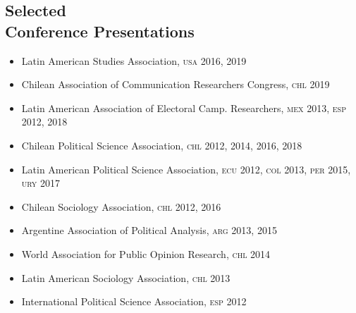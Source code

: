 \documentclass[letterpaper,margin]{res}
\begin{document}
\begin{resume}




\section{\footnotesize Selected \\ Conference Presentations}

\begin{itemize}
\item{\small Latin American Studies Association, {\scshape usa} 2016, 2019}
\item{\small Chilean Association of Communication Researchers Congress, {\scshape chl} 2019}
\item{\small Latin American Association of Electoral Camp. Researchers, {\scshape mex} 2013, {\scshape esp} 2012, 2018}
\item{\small Chilean Political Science Association, {\scshape chl} 2012, 2014, 2016, 2018}
\item{\small Latin American Political Science Association, {\scshape ecu} 2012, {\scshape col} 2013, {\scshape per} 2015, {\scshape ury} 2017}
\item{\small Chilean Sociology Association, {\scshape chl} 2012, 2016}
\item{\small Argentine Association of Political Analysis, {\scshape arg} 2013, 2015}
\item{\small World Association for Public Opinion Research, {\scshape chl} 2014}
\item{\small Latin American Sociology Association, {\scshape chl} 2013}
\item{\small International Political Science Association, {\scshape esp} 2012}
\end{itemize}


\end{resume}
\end{document}
